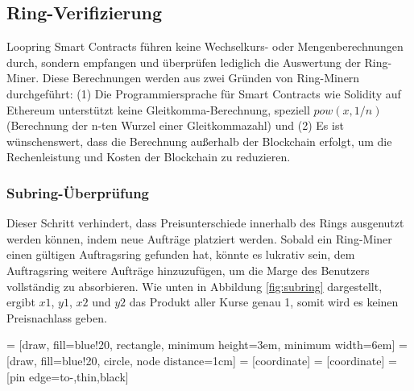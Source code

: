 \documentclass[UTF8,nofonts]{article}
\makeatletter
\newenvironment{figurehere}
 {\def\@captype{figure}}
 {}
\makeatother
\begin{document}
\begin{multicols}{2}
\subsection{Ring-Verifizierung\label{sec:ring_verification}}

Loopring Smart Contracts führen keine Wechselkurs- oder Mengenberechnungen durch, sondern empfangen und überprüfen lediglich die Auswertung der Ring-Miner. Diese Berechnungen werden aus zwei Gründen von Ring-Minern durchgeführt: (1) Die Programmiersprache für Smart Contracts wie Solidity \cite{dannen2017introducing} auf Ethereum unterstützt keine Gleitkomma-Berechnung, speziell $pow(x, 1/n)$ (Berechnung der n-ten Wurzel einer Gleitkommazahl) und (2) Es ist wünschenswert, dass die Berechnung außerhalb der Blockchain erfolgt, um die Rechenleistung und Kosten der Blockchain zu reduzieren.

\subsubsection{Subring-Überprüfung\label{sec:sub_ring_check}}
Dieser Schritt verhindert, dass Preisunterschiede innerhalb des Rings ausgenutzt werden können, indem neue Aufträge platziert werden. Sobald ein Ring-Miner einen gültigen Auftragsring gefunden hat, könnte es lukrativ sein, dem Auftragsring weitere Aufträge hinzuzufügen, um die Marge des Benutzers vollständig zu absorbieren. Wie unten in Abbildung \ref{fig:subring} dargestellt, ergibt $x1$, $y1$, $x2$ und $y2$ das Produkt aller Kurse genau 1, somit wird es keinen Preisnachlass geben.

\begin{center}
\begin{figurehere}
\centering
{} = [draw, fill=blue!20, rectangle, 
    minimum height=3em, minimum width=6em]
 = [draw, fill=blue!20, circle, node distance=1cm]
 = [coordinate]
 = [coordinate]
 = [pin edge={to-,thin,black}]

\end{figurehere}
\end{center}
\end{multicols}
\end{document}
